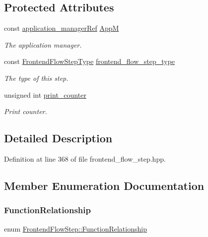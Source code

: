 \subsection*{Protected Attributes}
\begin{DoxyCompactItemize}
\item 
const \hyperlink{application__manager_8hpp_a04ccad4e5ee401e8934306672082c180}{application\+\_\+manager\+Ref} \hyperlink{classFrontendFlowStep_a0ac0d8db2a378416583f51c4faa59d15}{AppM}
\begin{DoxyCompactList}\small\item\em The application manager. \end{DoxyCompactList}\item 
const \hyperlink{frontend__flow__step_8hpp_afeb3716c693d2b2e4ed3e6d04c3b63bb}{Frontend\+Flow\+Step\+Type} \hyperlink{classFrontendFlowStep_ad49067d6a17119d47316149ab757b60d}{frontend\+\_\+flow\+\_\+step\+\_\+type}
\begin{DoxyCompactList}\small\item\em The type of this step. \end{DoxyCompactList}\item 
unsigned int \hyperlink{classFrontendFlowStep_aa22bfdf7687689934042882df869c7ec}{print\+\_\+counter}
\begin{DoxyCompactList}\small\item\em Print counter. \end{DoxyCompactList}\end{DoxyCompactItemize}


\subsection{Detailed Description}


Definition at line 368 of file frontend\+\_\+flow\+\_\+step.\+hpp.



\subsection{Member Enumeration Documentation}
\mbox{\label{classFrontendFlowStep_af7cf30f2023e5b99e637dc2058289ab0}} 
\subsubsection{\texorpdfstring{Function\+Relationship}{FunctionRelationship}}
{\footnotesize\ttfamily enum \hyperlink{classFrontendFlowStep_af7cf30f2023e5b99e637dc2058289ab0}{Frontend\+Flow\+Step\+::\+Function\+Relationship}}



